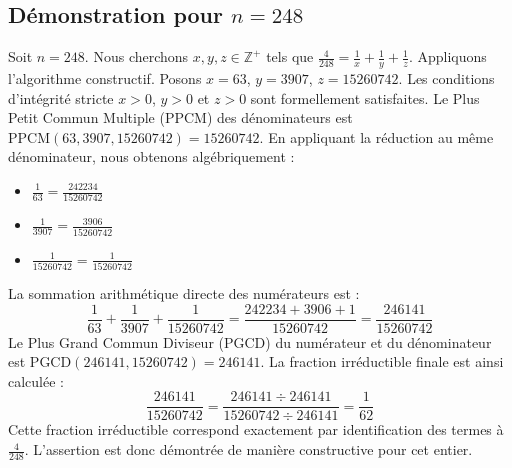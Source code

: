 \documentclass[11pt,a4paper]{article}
\begin{document}
\subsection{Démonstration pour $n = 248$}
Soit $n = 248$. Nous cherchons $x, y, z \in \mathbb{Z}^{+}$ tels que $\frac{4}{248} = \frac{1}{x} + \frac{1}{y} + \frac{1}{z}$.
Appliquons l'algorithme constructif. Posons $x = 63$, $y = 3907$, $z = 15260742$.
Les conditions d'intégrité stricte $x > 0$, $y > 0$ et $z > 0$ sont formellement satisfaites.
Le Plus Petit Commun Multiple (PPCM) des dénominateurs est $\text{PPCM}(63, 3907, 15260742) = 15260742$.
En appliquant la réduction au même dénominateur, nous obtenons algébriquement :
\begin{itemize}
    \item $\frac{1}{63} = \frac{242234}{15260742}$
    \item $\frac{1}{3907} = \frac{3906}{15260742}$
    \item $\frac{1}{15260742} = \frac{1}{15260742}$
\end{itemize}
La sommation arithmétique directe des numérateurs est :
$$ \frac{1}{63} + \frac{1}{3907} + \frac{1}{15260742} = \frac{242234 + 3906 + 1}{15260742} = \frac{246141}{15260742} $$
Le Plus Grand Commun Diviseur (PGCD) du numérateur et du dénominateur est $\text{PGCD}(246141, 15260742) = 246141$.
La fraction irréductible finale est ainsi calculée :
$$ \frac{246141}{15260742} = \frac{246141 \div 246141}{15260742 \div 246141} = \frac{1}{62} $$
Cette fraction irréductible correspond exactement par identification des termes à $\frac{4}{248}$. L'assertion est donc démontrée de manière constructive pour cet entier.
\end{document}
